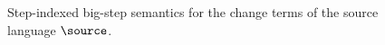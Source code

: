 \begin{figure}
\begin{mathpar}
  \end{mathpar}
  \caption{Step-indexed big-step semantics for the change terms of the source language $\source$.}
  \label{fig:source-definition-change-terms-semantics}
\end{figure}
